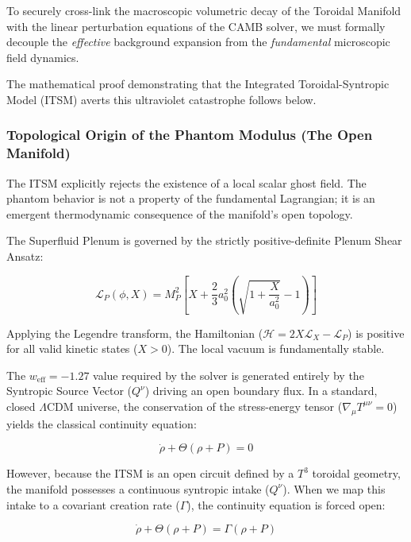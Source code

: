 \documentclass[aps,prd,10pt,twocolumn,superscriptaddress,nofootinbib,floatfix]{revtex4-2}
\begin{document}
To securely cross-link the macroscopic volumetric decay of the Toroidal Manifold with the linear perturbation equations of the CAMB solver, we must formally decouple the \emph{effective} background expansion from the \emph{fundamental} microscopic field dynamics.

The mathematical proof demonstrating that the Integrated Toroidal-Syntropic Model (ITSM) averts this ultraviolet catastrophe follows below.

\subsubsection{Topological Origin of the Phantom Modulus (The Open Manifold)}

The ITSM explicitly rejects the existence of a local scalar ghost field. The phantom behavior is not a property of the fundamental Lagrangian; it is an emergent thermodynamic consequence of the manifold's open topology.

The Superfluid Plenum is governed by the strictly positive-definite Plenum Shear Ansatz:

\begin{equation}
\mathcal{L}_P(\phi,X) = M_P^2 \left[ X + \frac{2}{3}a_0^2 \left( \sqrt{1+\frac{X}{a_0^2}} - 1 \right) \right]
\end{equation}

Applying the Legendre transform, the Hamiltonian ($\mathcal{H} = 2X\mathcal{L}_X - \mathcal{L}_P$) is positive for all valid kinetic states ($X > 0$). The local vacuum is fundamentally stable.

The $w_{\text{eff}} = -1.27$ value required by the solver is generated entirely by the Syntropic Source Vector ($Q^\nu$) driving an open boundary flux. In a standard, closed $\Lambda$CDM universe, the conservation of the stress-energy tensor ($\nabla_\mu T^{\mu\nu} = 0$) yields the classical continuity equation:

\begin{equation}
\dot{\rho} + \Theta(\rho + P) = 0
\end{equation}

However, because the ITSM is an open circuit defined by a $T^3$ toroidal geometry, the manifold possesses a continuous syntropic intake ($Q^\nu$). When we map this intake to a covariant creation rate ($\Gamma$), the continuity equation is forced open:

\begin{equation}
\dot{\rho} + \Theta(\rho + P) = \Gamma(\rho + P)
\end{equation}
\end{document}
